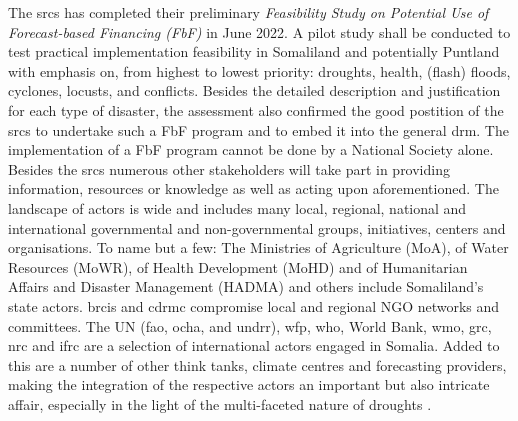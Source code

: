 The \acrfull{srcs} has completed their preliminary \textit{Feasibility Study on Potential Use of Forecast-based Financing (FbF)} in June 2022. A pilot study shall be conducted to test practical implementation feasibility in Somaliland and potentially Puntland with emphasis on, from highest to lowest priority: droughts, health, (flash) floods, cyclones, locusts, and conflicts. Besides the detailed description and justification for each type of disaster, the assessment also confirmed the good postition of the \acrshort{srcs} to undertake such a FbF program and to embed it into the general \acrlong{drm}.\newline
The implementation of a FbF program cannot be done by a National Society alone. Besides the \acrshort{srcs} numerous other stakeholders will take part in providing information, resources or knowledge as well as acting upon aforementioned. The landscape of actors is wide and includes many local, regional, national and international governmental and non-governmental groups, initiatives, centers and organisations. To name but a few: The Ministries of Agriculture (MoA), of Water Resources (MoWR), of Health Development (MoHD) and of Humanitarian Affairs and Disaster Management (HADMA) and others include Somaliland's state actors. \acrfull{brcis} and \acrfull{cdrmc} compromise local and regional NGO networks and committees. The UN (\acrshort{fao}, \acrshort{ocha}, and \acrshort{undrr}), \acrshort{wfp}, \acrshort{who}, World Bank, \acrshort{wmo}, \acrshort{grc}, \acrshort{nrc} and \acrshort{ifrc} are a selection of international actors engaged in Somalia. Added to this are a number of other think tanks, climate centres and forecasting providers, making the integration of the respective actors an important but also intricate affair, especially in the light of the multi-faceted nature of droughts \autocite{rcrcForecastbasedFinancingEarly2020,scrsFeasibilityStudyPotential2022}.

